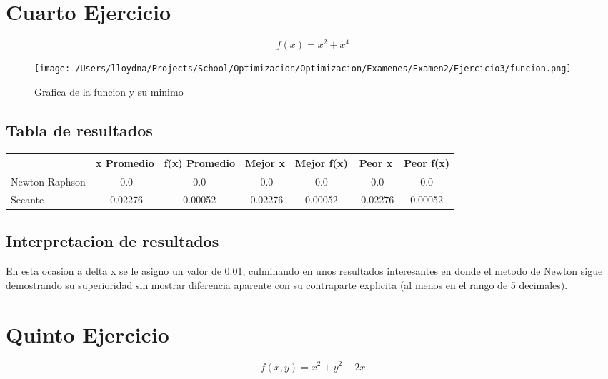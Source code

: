 \documentclass{report}
\begin{document}
        \section{Cuarto Ejercicio}
            \begin{equation*}
                f(x)=x^2+x^4
            \end{equation*}

            \begin{figure}[H]
                \texttt{[image: /Users/lloydna/Projects/School/Optimizacion/Optimizacion/Examenes/Examen2/Ejercicio3/funcion.png]}
                \caption{Grafica de la funcion y su minimo}
                \label{fig:fun14}
            \end{figure}

            \subsection{Tabla de resultados}
                \begin{tabular}{l|c|c|c|c|c|c}
                    & x Promedio & f(x) Promedio & Mejor x & Mejor f(x) & Peor x & Peor f(x)\\
                    \hline
                    Newton Raphson & -0.0 & 0.0 & -0.0 & 0.0 & -0.0 & 0.0\\
                    \hline
                    Secante & -0.02276 & 0.00052 & -0.02276 & 0.00052 & -0.02276 & 0.00052\\
                    \hline
                \end{tabular}

            \subsection{Interpretacion de resultados}
            En esta ocasion a delta x se le asigno un valor de 0.01, culminando en unos resultados
            interesantes en donde el metodo de Newton sigue demostrando su superioridad sin mostrar
            diferencia aparente con su contraparte explicita (al menos en el rango de 5 decimales).
        \pagebreak

        \section{Quinto Ejercicio}
            \begin{equation*}
                f(x,y)=x^2+y^2-2x
            \end{equation*}
\end{document}
